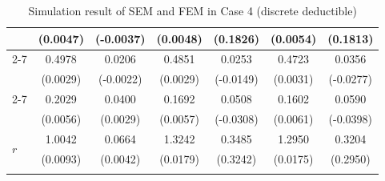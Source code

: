 \begin{table}[!ht]
{{\begin{minipage}{0.65\textwidth}
\begin{tabular}{lcccccc}
         & (0.0047) & (-0.0037) & (0.0048) & (0.1826) & (0.0054) & (0.1813) \\
        \cmidrule{2-7}
         & 0.4978 & 0.0206 & 0.4851 & 0.0253 & 0.4723 & 0.0356 \\
         & (0.0029) & (-0.0022) & (0.0029) & (-0.0149) & (0.0031) & (-0.0277) \\
        \cmidrule{2-7}
         & 0.2029 & 0.0400 & 0.1692 & 0.0508 & 0.1602 & 0.0590 \\
         & (0.0056) & (0.0029) & (0.0057) & (-0.0308) & (0.0061) & (-0.0398) \\
        \midrule
        \multirow{2}{*}{$r$} & 1.0042 & 0.0664 & 1.3242 & 0.3485 & 1.2950 & 0.3204 \\
         & (0.0093) & (0.0042) & (0.0179) & (0.3242) & (0.0175) & (0.2950) \\
        \hhline{=======}
        \end{tabular}
    \end{minipage}
}
}
\caption{Simulation result of SEM and FEM in Case 4 (discrete deductible)}\label{tab:AppSimExoCase4}
\end{table}
